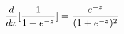 \documentclass[preview]{standalone}
\begin{document}
\begin{align*}
\special{dvisvgm:raw <g id='unique000'>}\frac{d}{dx}[\frac{1}{1+e^{-z}}]=\frac{e^{-z}}{(1+e^{-z})^2}\special{dvisvgm:raw </g>}
\end{align*}
\end{document}
